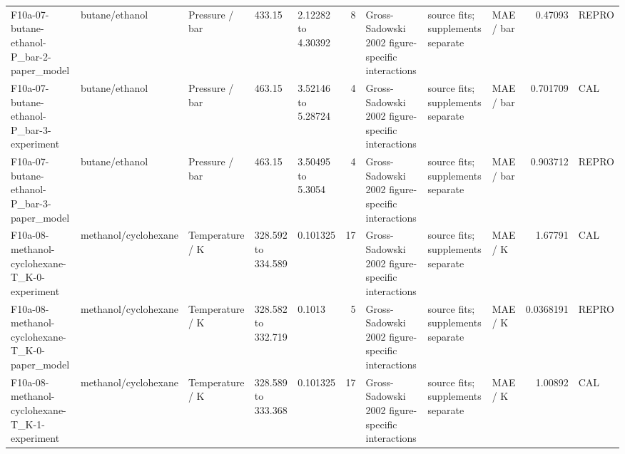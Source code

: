 \begin{landscape}
\begin{longtable}{L{1.9cm}L{2.5cm}L{2.1cm}L{1.6cm}L{1.6cm}rL{2.4cm}L{1.9cm}L{2.2cm}rL{1cm}}
F10a-\allowbreak{}07-\allowbreak{}butane-\allowbreak{}ethanol-\allowbreak{}P\_\allowbreak{}bar-\allowbreak{}2-\allowbreak{}paper\_\allowbreak{}model & butane/\allowbreak{}ethanol & Pressure /\allowbreak{} bar & 433.15 & 2.12282 to 4.30392 & 8 & Gross-\allowbreak{}Sadowski 2002 figure-\allowbreak{}specific interactions & source fits; supplements separate & MAE /\allowbreak{} bar & 0.47093 & REPRO \\
F10a-\allowbreak{}07-\allowbreak{}butane-\allowbreak{}ethanol-\allowbreak{}P\_\allowbreak{}bar-\allowbreak{}3-\allowbreak{}experiment & butane/\allowbreak{}ethanol & Pressure /\allowbreak{} bar & 463.15 & 3.52146 to 5.28724 & 4 & Gross-\allowbreak{}Sadowski 2002 figure-\allowbreak{}specific interactions & source fits; supplements separate & MAE /\allowbreak{} bar & 0.701709 & CAL \\
F10a-\allowbreak{}07-\allowbreak{}butane-\allowbreak{}ethanol-\allowbreak{}P\_\allowbreak{}bar-\allowbreak{}3-\allowbreak{}paper\_\allowbreak{}model & butane/\allowbreak{}ethanol & Pressure /\allowbreak{} bar & 463.15 & 3.50495 to 5.3054 & 4 & Gross-\allowbreak{}Sadowski 2002 figure-\allowbreak{}specific interactions & source fits; supplements separate & MAE /\allowbreak{} bar & 0.903712 & REPRO \\
F10a-\allowbreak{}08-\allowbreak{}methanol-\allowbreak{}cyclohexane-\allowbreak{}T\_\allowbreak{}K-\allowbreak{}0-\allowbreak{}experiment & methanol/\allowbreak{}cyclohexane & Temperature /\allowbreak{} K & 328.592 to 334.589 & 0.101325 & 17 & Gross-\allowbreak{}Sadowski 2002 figure-\allowbreak{}specific interactions & source fits; supplements separate & MAE /\allowbreak{} K & 1.67791 & CAL \\
F10a-\allowbreak{}08-\allowbreak{}methanol-\allowbreak{}cyclohexane-\allowbreak{}T\_\allowbreak{}K-\allowbreak{}0-\allowbreak{}paper\_\allowbreak{}model & methanol/\allowbreak{}cyclohexane & Temperature /\allowbreak{} K & 328.582 to 332.719 & 0.1013 & 5 & Gross-\allowbreak{}Sadowski 2002 figure-\allowbreak{}specific interactions & source fits; supplements separate & MAE /\allowbreak{} K & 0.0368191 & REPRO \\
F10a-\allowbreak{}08-\allowbreak{}methanol-\allowbreak{}cyclohexane-\allowbreak{}T\_\allowbreak{}K-\allowbreak{}1-\allowbreak{}experiment & methanol/\allowbreak{}cyclohexane & Temperature /\allowbreak{} K & 328.589 to 333.368 & 0.101325 & 17 & Gross-\allowbreak{}Sadowski 2002 figure-\allowbreak{}specific interactions & source fits; supplements separate & MAE /\allowbreak{} K & 1.00892 & CAL \\

\end{longtable}
\end{landscape}
